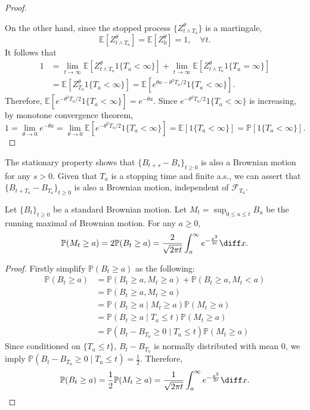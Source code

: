 \begin{proof}
\begin{itemize}
\end{itemize}
On the other hand, since the stopped process $\{Z_{t\land T_a}^\theta\}$ is a martingale,
\[
\mathbb{E}
[
Z_{t\land T_a}^\theta
]
=
\mathbb{E}
[
Z_{0}^\theta
]
=1,\quad\forall t.
\]
It follows that 
\begin{align*}
1&=
\lim_{t\to\infty}\mathbb{E}
[Z_{t\land T_a}^\theta1\{T_a<\infty\}]
+
\lim_{t\to\infty}\mathbb{E}
[
Z_{t\land T_a}^\theta1\{T_a=\infty\}
]\\
&=\mathbb{E}
[
Z_{T_a}^\theta1\{T_a<\infty\}
]
=
\mathbb{E}
[
e^{\theta a - \theta^2T_a/2}1\{T_a<\infty\}
].
\end{align*}
Therefore, $\mathbb{E}[e^{- \theta^2T_a/2}1\{T_a<\infty\}]=e^{-\theta a}$. Since $e^{- \theta^2T_a/2}1\{T_a<\infty\}$ is increasing, by monotone convergence theorem,
\[
1=\lim_{\theta\to0}e^{-\theta a}=\lim_{\theta\to0}\mathbb{E}[e^{- \theta^2T_a/2}1\{T_a<\infty\}]
=\mathbb{E}[1\{T_a<\infty\}]=\mathbb{P}[1\{T_a<\infty\}].
\]


\end{proof}

\begin{remark}
The stationary property shows that $\{B_{t+s}-B_s\}_{t\ge0}$ is also a Brownian motion for any $s>0$.
Given that $T_a$ is a stopping time and finite a.s., we can assert that $\{B_{t+T_a}-B_{T_a}\}_{t\ge0}$ is also a Brownian motion, independent of $\mathcal{F}_{T_a}$.
\end{remark}

\begin{theorem}\label{The:7:2}
Let $\{B_{t}\}_{t\ge0}$ be a standard Brownian motion.
Let $M_t=\sup_{0\le u\le t}B_u$ be the running maximal of Brownian motion.
For any $a\ge0$,
\[
\mathbb{P}(M_t\ge a) = 2\mathbb{P}(B_t\ge a) = \frac{2}{\sqrt{2\pi t}}\int_a^{\infty}e^{-\frac{x^2}{2t}}\diff x.
\]
\end{theorem}
\begin{proof}
Firstly simplify $\mathbb{P}(B_t\ge a)$ as the following:
\begin{align*}
\mathbb{P}(B_t\ge a)&=
\mathbb{P}(B_t\ge a, M_t\ge a) + \mathbb{P}(B_t\ge a, M_t< a)\\
&=\mathbb{P}(B_t\ge a, M_t\ge a)\\
&=\mathbb{P}(B_t\ge a\mid M_t\ge a)\mathbb{P}(M_t\ge a)\\
&=\mathbb{P}(B_t\ge a\mid T_a\le t)\mathbb{P}(M_t\ge a)\\
&=\mathbb{P}(B_t- B_{T_a}\ge 0\mid T_a\le t)\mathbb{P}(M_t\ge a)
\end{align*}
Since conditioned on $\{T_a\le t\}$, $B_t-B_{T_a}$ is normally distributed with mean $0$, we imply 
$\mathbb{P}(B_t- B_{T_a}\ge 0\mid T_a\le t)=\frac{1}{2}$.
Therefore,
\[
\mathbb{P}(B_t\ge a)=\frac{1}{2}\mathbb{P}(M_t\ge a)=\frac{1}{\sqrt{2\pi t}}\int_a^{\infty}e^{-\frac{x^2}{2t}}\diff x.
\]

\end{proof}

